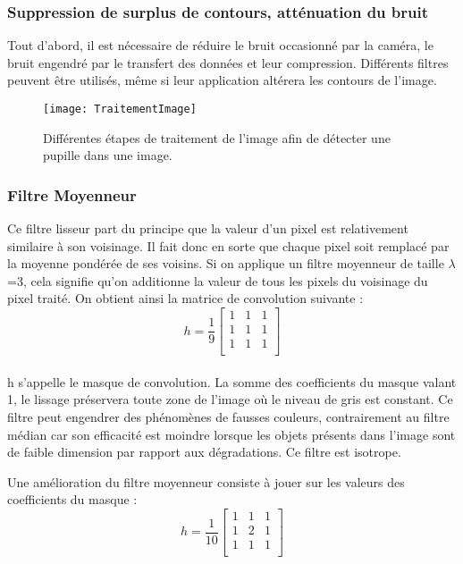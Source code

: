 \subsubsection*{Suppression de surplus de contours, atténuation du bruit}
\label{Filtre}

Tout d’abord, il est nécessaire de réduire le bruit occasionné par la caméra, le bruit engendré par le transfert des données et leur compression. Différents filtres \cite{bergounioux2010quelques} peuvent être utilisés, même si leur application altérera les contours de l’image. 

\begin{figure}[H]
  \centering
  \texttt{[image: TraitementImage]}
  \caption{Différentes étapes de traitement de l’image afin de détecter une pupille dans une image.}
  \label{fig:TraitementImage}
\end{figure}

\subsubsection*{Filtre Moyenneur}

Ce filtre lisseur part du principe que la valeur d'un pixel est relativement similaire à son voisinage. Il fait donc en sorte que chaque pixel soit remplacé par la moyenne pondérée de ses voisins. Si on applique un filtre moyenneur de taille $\lambda$=3, cela signifie qu'on additionne la valeur de tous les pixels du voisinage du pixel traité. On obtient ainsi la matrice de convolution suivante :
$$h = \frac{1}{9}
\begin{bmatrix}
	1 & 1 & 1 \\
	1 & 1 & 1 \\
	1 & 1 & 1 \\
\end{bmatrix}  $$

\paragraph{}
h s’appelle le masque de convolution. La somme des coefficients du masque valant 1, le lissage préservera toute zone de l’image où le niveau de gris est constant. Ce filtre peut engendrer des phénomènes de fausses couleurs, contrairement au filtre médian car son efficacité est moindre lorsque les objets présents dans l'image sont de faible dimension par rapport aux dégradations. Ce filtre est isotrope. 

Une amélioration du filtre moyenneur consiste à jouer sur les valeurs des coefficients du masque :
$$h = \frac{1}{10}
\begin{bmatrix}
	1 & 1 & 1 \\
	1 & 2 & 1 \\
	1 & 1 & 1 \\
\end{bmatrix}  $$

